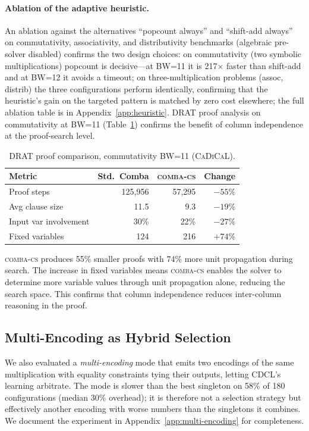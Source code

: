 \documentclass[a4paper]{ceurart}
\newcommand{\combacs}{\textsc{comba-cs}\xspace}
\newcommand{\cadical}{\textsc{CaDiCaL}\xspace}
\begin{document}
\paragraph{Ablation of the adaptive heuristic.}
An ablation against the alternatives ``popcount always'' and
``shift-add always'' on commutativity, associativity, and
distributivity benchmarks (algebraic pre-solver disabled)
confirms the two design choices: on commutativity (two symbolic
multiplications) popcount is decisive---at BW=11 it is
217$\times$ faster than shift-add and at BW=12 it avoids a timeout;
on three-multiplication problems (assoc, distrib) the three
configurations perform identically, confirming that the
heuristic's gain on the targeted pattern is matched by zero cost
elsewhere; the full ablation table is in
Appendix~\ref{app:heuristic}. DRAT proof analysis on commutativity
at BW=11 (Table~\ref{tab:proof}) confirms the benefit of column
independence at the proof-search level.

\begin{table}[ht]
\caption{DRAT proof comparison, commutativity BW=11 (\cadical).}
\label{tab:proof}
\centering
\begin{tabular}{lrrr}
\toprule
Metric & Std.\ Comba & \combacs & Change \\
\midrule
Proof steps       & 125,956 & 57,295  & $-55\%$ \\
Avg clause size   & 11.5    & 9.3     & $-19\%$ \\
Input var involvement & 30\% & 22\%   & $-27\%$ \\
Fixed variables   & 124     & 216     & $+74\%$ \\
\bottomrule
\end{tabular}
\end{table}

\combacs produces 55\% smaller proofs with 74\% more unit propagation
during search. The increase in fixed variables means \combacs enables
the solver to determine more variable values through unit propagation
alone, reducing the search space. This confirms that column
independence reduces inter-column reasoning in the proof.

\subsection{Multi-Encoding as Hybrid Selection}
\label{sec:multi-encoding}

We also evaluated a \emph{multi-encoding} mode that emits two
encodings of the same multiplication with equality constraints
tying their outputs, letting CDCL's learning arbitrate. The mode
is slower than the best singleton on 58\% of 180 configurations
(median 30\% overhead); it is therefore not a selection strategy
but effectively another encoding with worse numbers than the
singletons it combines. We document the experiment in
Appendix~\ref{app:multi-encoding} for completeness.
\end{document}
